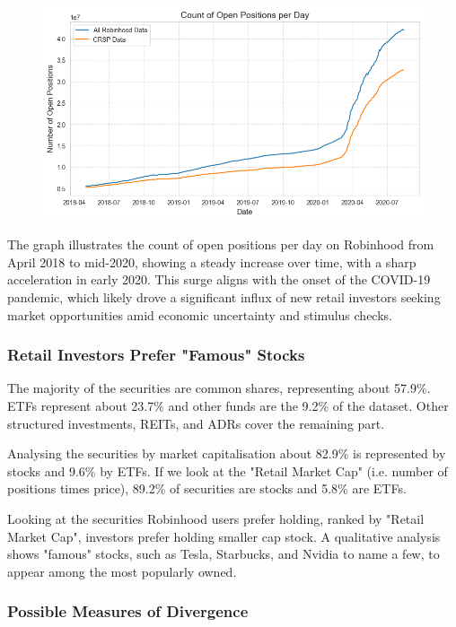 \begin{figure}[h!]
        \centering
        \includegraphics[width=0.8\linewidth]{../images/no_positions_vs_date_drop.png}
\end{figure}

The graph illustrates the  count of open positions per day  on Robinhood from April 2018 to mid-2020, showing a  steady increase  over time, with a  sharp acceleration in early 2020. This surge aligns with the onset of the  COVID-19 pandemic, which likely drove a significant influx of new retail investors seeking market opportunities amid economic uncertainty and stimulus checks. 



\subsubsection{Retail Investors Prefer "Famous" Stocks}

The majority of the securities are common shares, representing about 57.9\%. ETFs represent about 23.7\% and other funds are the 9.2\% of the dataset. Other structured investments, REITs, and ADRs cover the remaining part.

Analysing the securities by market capitalisation about 82.9\% is represented by stocks and 9.6\% by ETFs. If we look at the "Retail Market Cap" (i.e. number of positions times price), 89.2\% of securities are stocks and 5.8\% are ETFs.  

Looking at the securities Robinhood users prefer holding, ranked by "Retail Market Cap", investors prefer holding smaller cap stock. A qualitative analysis shows "famous" stocks, such as Tesla, Starbucks, and Nvidia to name a few, to appear among the most popularly owned.

\subsubsection{Possible Measures of Divergence} 
